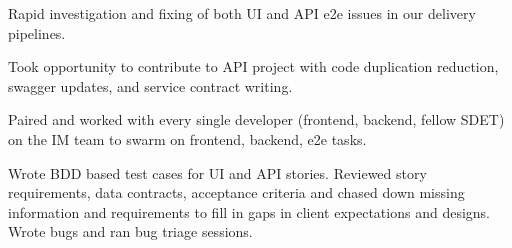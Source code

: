 \begin{cventries}
{\begin{cvitems}
        \item {Rapid investigation and fixing of both UI and API e2e issues in our delivery pipelines.}
        \item {Took opportunity to contribute to API project with code duplication reduction, swagger updates, and service contract writing.}
        \item {Paired and worked with every single developer (frontend, backend, fellow SDET) on the IM team to swarm on frontend, backend, e2e tasks.}
        \item {Wrote BDD based test cases for UI and API stories. Reviewed story requirements, data contracts, acceptance criteria and chased down missing information and requirements to fill in gaps in client expectations and designs. Wrote bugs and ran bug triage sessions.}
      \end{cvitems}
    }


\end{cventries}
